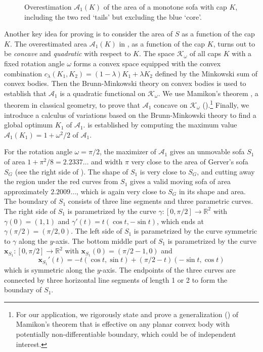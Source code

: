 \begin{figure}
\centering

\caption{Overestimation \(\mathcal{A}_1(K)\) of the area of a monotone sofa with cap \(K\), including the two red ‘tails’ but excluding the blue ‘core’.}
\label{fig:a1-upper-bound}
\end{figure}

Another key idea for proving  is to consider the area of \(S\) as a function of the cap \(K\). The overestimated area \(\mathcal{A}_1(K)\) in , as a function of the cap \(K\), turns out to be \emph{concave} and \emph{quadratic} with respect to \(K\). The space \(\mathcal{K}_\omega\) of all caps \(K\) with a fixed rotation angle \(\omega\) forms a convex space equipped with the convex combination \(c_\lambda(K_1, K_2) = (1 - \lambda) K_1 + \lambda K_2\) defined by the Minkowski sum of convex bodies. Then the Brunn-Minkowski theory on convex bodies \cite{schneider_2013} is used to establish that \(\mathcal{A}_1\) is a quadratic functional on \(\mathcal{K}_\omega\). We use Mamikon’s theorem \autocite{mnatsakanianAnnularRingsEqual1997}, a theorem in classical geometry, to prove that \(\mathcal{A}_1\) concave on \(\mathcal{K}_\omega\) ().\footnote{For our application, we rigorously state and prove a generalization () of Mamikon’s theorem that is effective on any planar convex body with potentially non-differentiable boundary, which could be of independent interest.} Finally, we introduce a calculus of variations based on the Brunn-Minkowski theory to find a global optimum \(K_1\) of \(\mathcal{A}_1\).  is established by computing the maximum value \(\mathcal{A}_1(K_1) = 1 + \omega^2/2\) of \(\mathcal{A}_1\).

For the rotation angle \(\omega = \pi/2\), the maximizer of \(\mathcal{A}_1\) gives an unmovable sofa \(S_1\) of area \(1 + \pi^2/8 = 2.2337\dots\) and width \(\pi\) very close to the area of Gerver’s sofa \(S_G\) (see the right side of ). The shape of \(S_1\) is very close to \(S_G\), and cutting away the region under the red curves from \(S_1\) gives a valid moving sofa of area approximately \(2.2009\dots\), which is again very close to \(S_G\) in its shape and area. The boundary of \(S_1\) consists of three line segments and three parametric curves. The right side of \(S_1\) is parametrized by the curve \(\gamma : [0, \pi/2] \to \mathbb{R}^2\) with \(\gamma(0) = (1, 1)\) and \(\gamma'(t) = t(\cos t, -\sin t)\), which ends at \(\gamma(\pi/2) = (\pi/2, 0)\). The left side of \(S_1\) is parametrized by the curve symmetric to \(\gamma\) along the \(y\)-axis. The bottom middle part of \(S_1\) is parametrized by the curve \(\mathbf{x}_{S_1} : [0, \pi/2] \to \mathbb{R}^2\) with \(\mathbf{x}_{S_1}(0) = (\pi/2-1, 0)\) and
\[
\mathbf{x}_{S_1}'(t) = -t (\cos t, \sin t) + (\pi/2- t) (-\sin t, \cos t)
\]
which is symmetric along the \(y\)-axis. The endpoints of the three curves are connected by three horizontal line segments of length 1 or 2 to form the boundary of \(S_1\).